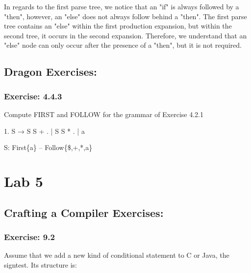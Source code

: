 \documentclass[letterpaper, 10pt,DIV=13]{scrartcl}
\numberwithin{equation}{section} %
\numberwithin{figure}{section} %
\numberwithin{table}{section} %
\begin{document}
In regards to the first parse tree, we notice that an "if" is always followed by a "then", however, an "else" does not always follow behind a "then". The first parse tree contains an "else" within the first production expansion, but within the second tree, it occurs in the second expansion. Therefore, we understand that an "else" node can only occur after the presence of a "then", but it is not required.
 
\subsection*{Dragon Exercises:}

\subsubsection*{Exercise: 4.4.3}
Compute FIRST and FOLLOW for the grammar of Exercise 4.2.1

    1. S → S S + .   | S S * .   | a    \newline

    S: First\{a\} -- Follow\{\$,+,*,a\} \newline



\pagebreak

\section*{Lab 5}

\subsection*{Crafting a Compiler Exercises:}

\subsubsection*{Exercise: 9.2}
Assume that we add a new kind of conditional statement to C or Java, the signtest. Its structure is: \newline
\end{document}
